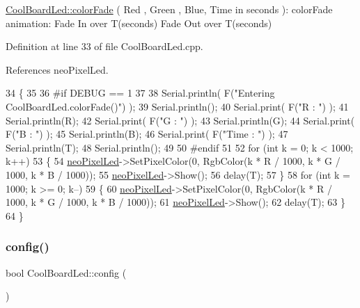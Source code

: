 \hyperlink{classCoolBoardLed_a6dbfe23988f43e1242cd05e69b13ff30}{Cool\+Board\+Led\+::color\+Fade} ( Red , Green , Blue, Time in seconds )\+: color\+Fade animation\+: Fade In over T(seconds) Fade Out over T(seconds) 

Definition at line 33 of file Cool\+Board\+Led.\+cpp.



References neo\+Pixel\+Led.


\begin{DoxyCode}
34 \{
35 
36 \textcolor{preprocessor}{#if DEBUG == 1}
37 
38     Serial.println( F(\textcolor{stringliteral}{"Entering CoolBoardLed.colorFade()"}) );
39     Serial.println();
40     Serial.print( F(\textcolor{stringliteral}{"R : "}) );
41     Serial.println(R);
42     Serial.print( F(\textcolor{stringliteral}{"G : "}) );
43     Serial.println(G);
44     Serial.print( F(\textcolor{stringliteral}{"B : "}) );
45     Serial.println(B);
46     Serial.print( F(\textcolor{stringliteral}{"Time : "}) );
47     Serial.println(T);
48     Serial.println();
49 
50 \textcolor{preprocessor}{#endif  }
51 
52     \textcolor{keywordflow}{for} (\textcolor{keywordtype}{int} k = 0; k < 1000; k++) 
53     \{
54         \hyperlink{classCoolBoardLed_ac2c13fa462a010cd9242bf297c013923}{neoPixelLed}->SetPixelColor(0, RgbColor(k * R / 1000, k * G / 1000, k * B / 1000));
55         \hyperlink{classCoolBoardLed_ac2c13fa462a010cd9242bf297c013923}{neoPixelLed}->Show();
56         delay(T);
57     \}
58     \textcolor{keywordflow}{for} (\textcolor{keywordtype}{int} k = 1000; k >= 0; k--) 
59     \{
60         \hyperlink{classCoolBoardLed_ac2c13fa462a010cd9242bf297c013923}{neoPixelLed}->SetPixelColor(0, RgbColor(k * R / 1000, k * G / 1000, k * B / 1000));
61         \hyperlink{classCoolBoardLed_ac2c13fa462a010cd9242bf297c013923}{neoPixelLed}->Show();
62         delay(T);
63     \}
64 \}
\end{DoxyCode}
\mbox{\label{classCoolBoardLed_a1b60e5e30bea96c49ed62ed1bf1ffc8b}} 
\subsubsection{\texorpdfstring{config()}{config()}}
{\footnotesize\ttfamily bool Cool\+Board\+Led\+::config (\begin{DoxyParamCaption}{ }\end{DoxyParamCaption})}

